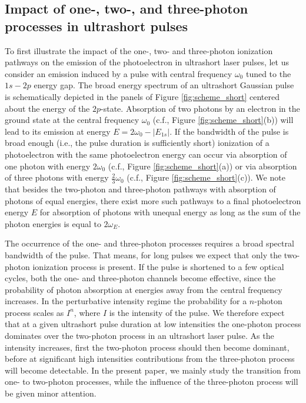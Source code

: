 \subsection{\label{sec:short_scheme}Impact of one-, two-, and three-photon processes in ultrashort pulses}
To first illustrate the impact of the one-, two- and three-photon ionization pathways on the emission of the photoelectron in ultrashort laser pulses, let us consider an emission induced by a pulse with central frequency $\omega_0$ tuned to the $1s-2p$ energy gap. The broad energy spectrum of an ultrashort Gaussian pulse is schematically depicted in the panels of Figure \ref{fig:scheme_short} centered about the energy of the $2p$-state. Absorption of two photons by an electron in the ground state at the central frequency $\omega_0$ (c.f., Figure \ref{fig:scheme_short}(b)) will lead to its emission at energy $E = 2\omega_0 - |E_{1s}|$. If the bandwidth of the pulse is broad enough (i.e., the pulse duration is sufficiently short) ionization of a photoelectron with the same photoelectron energy can occur via absorption of one photon with energy $2 \omega_0$ (c.f., Figure \ref{fig:scheme_short}(a)) or via absorption of three photons with energy $\frac{2}{3} \omega_0$ (c.f., Figure \ref{fig:scheme_short}(c)). We note that besides the two-photon and three-photon pathways with absorption of photons of equal energies, there exist more such pathways to a final photoelectron energy $E$ for absorption of photons with unequal energy as long as the sum of the photon energies is equal to $2 \omega_E$.

The occurrence of the one- and three-photon processes requires a broad spectral bandwidth of the pulse. That means, for long pulses we expect that only the two-photon ionization process is present. If the pulse is shortened to a few optical cycles, both the one- and three-photon channels become effective, since the probability of photon absorption at energies away from the central frequency increases. In the perturbative intensity regime the probability for a $n$-photon process scales as $I^n$, where $I$ is the intensity of the pulse. We therefore expect that at a given ultrashort pulse duration at low intensities the one-photon process dominates over the two-photon process in an ultrashort laser pulse. As the intensity increases, first the two-photon process should then become dominant, before at significant high intensities contributions from the three-photon process will become detectable. In the present paper, we mainly study the transition from one- to two-photon processes, while the influence of the three-photon process will be given minor attention. 

